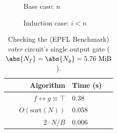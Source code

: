 \documentclass[english, aspectratio=169]{beamer}
\newcommand{\sort}[0]{\text{sort}}
\begin{document}
\begin{frame}

  \begin{figure}
    \centering

    \begin{tikzpicture}[scale=0.9, every node/.style={transform shape}]
      
    \end{tikzpicture}

    \caption{Base case: $n$}
  \end{figure}
  
\end{frame}

\begin{frame}
  
  \begin{figure}
    \centering

    \begin{tikzpicture}[scale=0.85, every node/.style={transform shape}]
      
    \end{tikzpicture}

    \caption{Induction case: $i < n$}
  \end{figure}
  
\end{frame}


\blankframe

\begin{frame}

  \begin{table}
    \centering
    \begin{tabular}{r | l}
      Algorithm                         & Time (s)
      \\ \hline
      $f \leftrightarrow g \equiv \top$ & 0.38
      \\
      $O(\sort(N))$                     & 0.058
      \\
      $2 \cdot N/B$                     & 0.006
    \end{tabular}

    \caption{Checking the (EPFL Benchmark) \emph{voter} circuit's single output
      gate ($\abs{N_f} = \abs{N_g} = 5.76~\text{MiB}$).}
  \end{table}
  
\end{frame}
\end{document}
